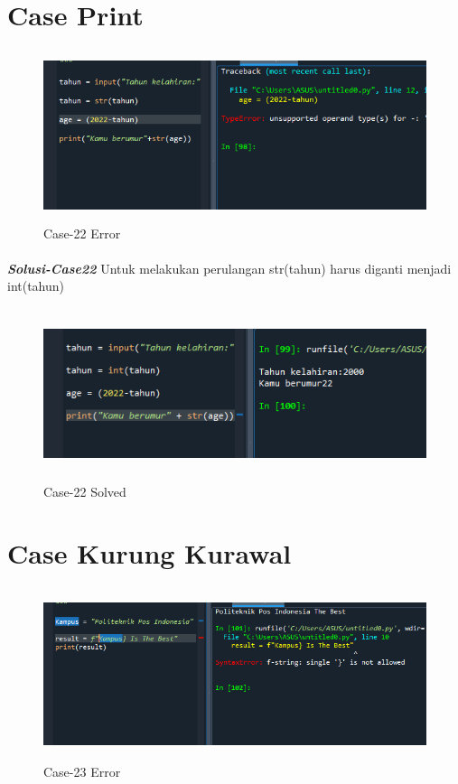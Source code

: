 \documentclass[12pt,a4paper]{article}
\begin{document}
\newpage
\section{Case Print}
\begin{figure}[ht]
    \centerline{\includegraphics[width=15cm,height=5cm]{image/case22.png}}
    \renewcommand{\figurename}{Gambar}
    \caption{Case-22 Error}
\end{figure}
\paragraph{}\textbf{\textit{Solusi-Case22}} {Untuk melakukan perulangan str(tahun) harus diganti menjadi int(tahun)}
\begin{figure}[ht]
    \centerline{\includegraphics[width=15cm,height=5cm]{image/case22-solved.png}}
    \renewcommand{\figurename}{Gambar}
    \caption{Case-22 Solved}
\end{figure}

\newpage
\section{Case Kurung Kurawal}
\begin{figure}[ht]
    \centerline{\includegraphics[width=15cm,height=5cm]{image/case23.png}}
    \renewcommand{\figurename}{Gambar}
    \caption{Case-23 Error}
\end{figure}
\end{document}
